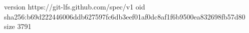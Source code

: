 version https://git-lfs.github.com/spec/v1
oid sha256:b69d222446006ddb627597fc6db3eef01af0dc8af1f6b9500ea832698fb57d80
size 3791
